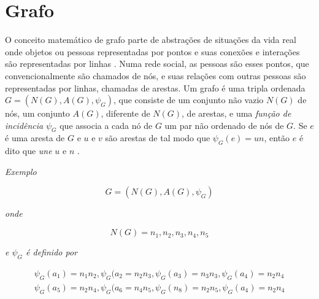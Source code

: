
\section{Grafo}

O conceito matemático de grafo parte de abstrações de situações da vida real onde objetos ou pessoas representadas por pontos e suas conexões e interações são representadas por linhas \cite{Bondy08}. Numa rede social, as pessoas são esses pontos, que convencionalmente são chamados de nós, e suas relações com outras pessoas são representadas por linhas, chamadas de arestas. Um grafo é uma tripla ordenada $G=(N(G), A(G), \psi _{G})$, que consiste de um conjunto não vazio $N(G)$ de nós, um conjunto $A(G)$, diferente de $N(G)$, de arestas, e uma \emph{função de incidência} $\psi_{G}$ que associa a cada nó de $G$ um par não ordenado de nós de $G$. Se $e$ é uma aresta de $G$ e $u$ e $v$ são arestas de tal modo que $\psi_{G}(e) = un$, então $e$ é dito que \emph{une} $u$ e $n$ \cite{Bondy08}.

\emph{Exemplo}

\begin{equation}
G=(N(G), A(G), \psi _{G})
\label{eq:grafo}
\end{equation}

\emph{onde}

\begin{equation}
N(G)={n_{1}, n_{2}, n_{3}, n_{4}, n_{5}}
\label{eq:grafo2}
\end{equation}

\emph{e $\psi_{G}$ é definido por}

\begin{equation}
\begin{split}
\psi_{G}(a_{1}) = n_{1}n_{2}, \psi_{G}(a_{2} = n_{2}n_{3}, \psi_{G}(a_{3}) = n_{3}n_{3}, \psi_{G}(a_{4}) = n_{2}n_{4} \\
\psi_{G}(a_{5}) = n_{2}n_{4}, \psi_{G}(a_{6} = n_{4}n_{5}, \psi_{G}(n_{8}) = n_{2}n_{5}, \psi_{G}(a_{4}) = n_{2}n_{4}
\label{eq:grafo3}
\end{split}
\end{equation}

